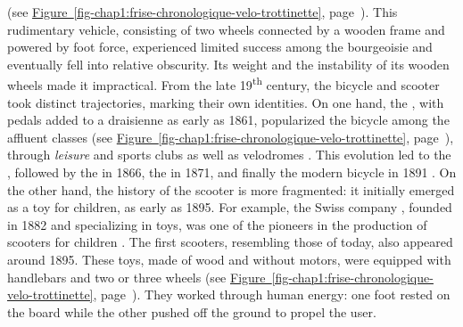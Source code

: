 \begin{refsegment}
{} (see \hyperref[fig-chap1:frise-chronologique-velo-trottinette]{Figure~\ref{fig-chap1:frise-chronologique-velo-trottinette}}, page~\pageref{fig-chap1:frise-chronologique-velo-trottinette}). This rudimentary vehicle, consisting of two wheels connected by a wooden frame and powered by foot force, experienced limited success among the bourgeoisie and eventually fell into relative obscurity. Its weight and the instability of its wooden wheels made it impractical. From the late 19\textsuperscript{th} century, the bicycle and scooter took distinct trajectories, marking their own identities. On one hand, the , with pedals added to a draisienne as early as 1861, popularized the bicycle among the affluent classes (see \hyperref[fig-chap1:frise-chronologique-velo-trottinette]{Figure~\ref{fig-chap1:frise-chronologique-velo-trottinette}}, page~\pageref{fig-chap1:frise-chronologique-velo-trottinette}), through \textsl{leisure} and sports clubs as well as velodromes \textcolor{blue}{\autocite[15-43]{dauncey_french_2012}}. This evolution led to the , followed by the  in 1866, the  in 1871, and finally the modern bicycle in 1891 \textcolor{blue}{\autocite[27]{heran_retour_2015}}. On the other hand, the history of the scooter is more fragmented: it initially emerged as a toy for children, as early as 1895. For example, the Swiss company , founded in 1882 and specializing in toys, was one of the pioneers in the production of scooters for children \textcolor{blue}{\autocite{schweizerisches_nationalmuseum_draisine_2018}}. The first scooters, resembling those of today, also appeared around 1895. These toys, made of wood and without motors, were equipped with handlebars and two or three wheels (see \hyperref[fig-chap1:frise-chronologique-velo-trottinette]{Figure~\ref{fig-chap1:frise-chronologique-velo-trottinette}}, page~\pageref{fig-chap1:frise-chronologique-velo-trottinette}). They worked through human energy: one foot rested on the board while the other pushed off the ground to propel the user.%


\end{refsegment}
